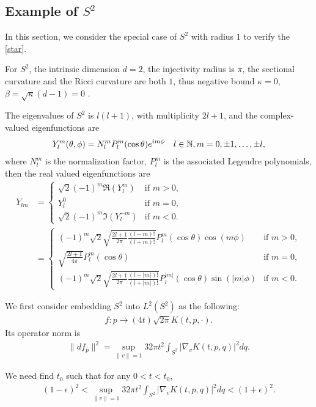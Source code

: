 \subsection{Example of \texorpdfstring{$S^2$}{S2}}
\label{sec:S2}
In this section, we consider the special case of $S^2$ with radius $1$ to verify the \cref{star}.

For $S^2$, the intrinsic dimension $d=2$, the injectivity radius is $\pi$, the sectional curvature and the Ricci curvature are both $1$, thus negative bound $\kappa=0$, $\beta=\sqrt{\kappa}(d-1)=0$ . 

The eigenvalues of $S^2$ is $l(l+1)$, with multiplicity $2l+1$, and the complex-valued eigenfunctions are 
\begin{align}
	Y_l^m(\theta,\phi)=N_l^m P_l^m(\cos \theta) e^{im\phi}\quad l\in \mathbb{N}, m=0,\pm1,\dots,\pm l,
\end{align} 
where $N_l^m$ is the normalization factor, $P_l^m$ is the associated Legendre polynomials, then the real valued eigenfunctions are
\begin{align}
Y_{lm} &= \begin{cases} 
	\sqrt{2}(-1)^m\Re(Y_l^{m}) & \text{if } m>0, \\
	Y_l^0 & \text{if } m = 0, \\
	\sqrt{2}(-1)^m\Im(Y_l^{-m}) & \text{if } m<0.
\end{cases} \\
&=\begin{cases} 
	(-1)^m \sqrt{2}\sqrt{\frac{2l+1}{2\pi} \frac{(l-m)!}{(l+m)!}}P_l^m(\cos \theta)\cos(m\phi) & \text{if } m>0, \\
	\sqrt{\frac{2l+1}{4\pi}} P_l^m(\cos \theta) & \text{if } m = 0, \\
		(-1)^m \sqrt{2}\sqrt{\frac{2l+1}{2\pi} \frac{(l-|m|)!}{(l+|m|)!}}P_l^{|m|}(\cos \theta)\sin(|m|\phi) & \text{if } m<0.
\end{cases}
\end{align}


We first consider embedding $S^2$ into $L^2(S^2)$ as the following:
\begin{align}
	f : p \rightarrow (4t) \sqrt{2\pi} K(t,p, \cdot).
\end{align}
Its operator norm is
\begin{align}
\|df_p\|^2= \sup_{\|v\|=1} 32\pi t^2 \int_{S^2} |\nabla_v K(t,p,q)|^2 dq.
\end{align}

We need find $t_0$ such that for any $0<t<t_0$, 
\begin{align}
	(1-\epsilon)^2<\sup_{\|v\|=1} 32\pi t^2 \int_{S^2} |\nabla_v K(t,p,q)|^2 dq < (1+\epsilon)^2.
\end{align}

